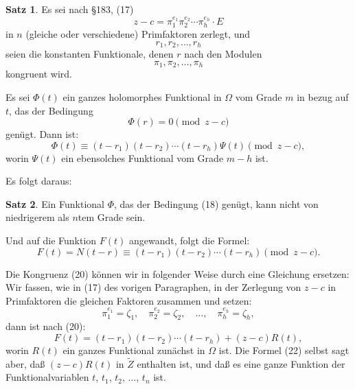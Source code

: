\documentclass[12pt,a4paper]{article}
\theoremstyle{definition}
\newtheorem{satz}{Satz}[section]
\begin{document}
\begin{satz}
Es sei nach \S 183, (17)
\begin{equation}
z - c = \pi_1^{e_1}\pi_2^{e_2}\cdots\pi_h^{e_h} \cdot E
\end{equation}
in $n$ (gleiche oder verschiedene) Primfaktoren zerlegt, und
\begin{equation}
r_1, r_2, \ldots, r_h
\end{equation}
seien die konstanten Funktionale, denen $r$ nach den Modulen
\begin{equation}
\pi_1, \pi_2, \ldots, \pi_h
\end{equation}
kongruent wird.

Es sei $\Phi(t)$ ein ganzes holomorphes Funktional in $\Omega$ vom Grade $m$ in bezug auf $t$, das der Bedingung
\begin{equation}
\Phi(r) = 0 \pmod{z - c}
\end{equation}
genügt. Dann ist:
\begin{equation}
\Phi(t) \equiv (t - r_1)(t - r_2)\cdots(t - r_h) \Psi(t) \pmod{z - c},
\end{equation}
worin $\Psi(t)$ ein ebensolches Funktional vom Grade $m - h$ ist.
\end{satz}

Es folgt daraus:

\begin{satz}
Ein Funktional $\Phi$, das der Bedingung (18) genügt, kann nicht von niedrigerem als $n$tem Grade sein.
\end{satz}

Und auf die Funktion $F(t)$ angewandt, folgt die Formel:
\begin{equation}
F(t) = N(t - r) \equiv (t - r_1)(t - r_2)\cdots(t - r_h) \pmod{z - c}.
\end{equation}

Die Kongruenz (20) können wir in folgender Weise durch eine Gleichung ersetzen: Wir fassen, wie in (17) des vorigen Paragraphen, in der Zerlegung von $z - c$ in Primfaktoren die gleichen Faktoren zusammen und setzen:
\begin{equation}
\pi_1^{e_1} = \zeta_1, \quad \pi_2^{e_2} = \zeta_2, \quad \ldots, \quad \pi_h^{e_h} = \zeta_h,
\end{equation}
dann ist nach (20):
\begin{equation}
F(t) = (t - r_1)(t - r_2)\cdots(t - r_h) + (z - c)R(t),
\end{equation}
worin $R(t)$ ein ganzes Funktional zunächst in $\Omega$ ist. Die Formel (22) selbst sagt aber, daß $(z-c)R(t)$ in $\tilde{Z}$ enthalten ist, und daß es eine ganze Funktion der Funktionalvariablen $t$, $t_1$, $t_2$, $\ldots$, $t_n$ ist.
\end{document}
